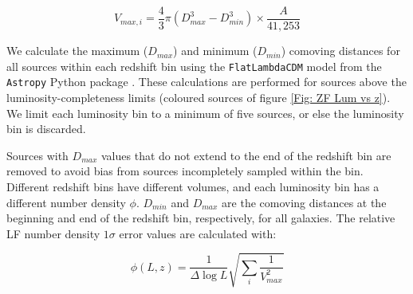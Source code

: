 \begin{equation}
    \label{EQ: Vmax}
    V_{max,i} = \frac{4}{3} \pi \left(D_{max}^3 - D_{min}^3\right) \times \frac{A}{41,253}
\end{equation}

We calculate the maximum ($D_{max}$) and minimum ($D_{min}$) comoving distances for all sources within each redshift bin using the \texttt{FlatLambdaCDM} model from the \texttt{Astropy} Python package \citep{astropy_collaboration_astropy_2022}. These calculations are performed for sources above the luminosity-completeness limits (coloured sources of figure \ref{Fig: ZF Lum vs z}). We limit each luminosity bin to a minimum of five sources, or else the luminosity bin is discarded. 

Sources with $D_{max}$ values that do not extend to the end of the redshift bin are removed to avoid bias from sources incompletely sampled within the bin. Different redshift bins have different volumes, and each luminosity bin has a different number density $\phi$. $D_{min}$ and $D_{max}$ are the comoving distances at the beginning and end of the redshift bin, respectively, for all galaxies. The relative LF number density $1\sigma$ error values are calculated with:

\begin{equation} \label{EQ: Vmax Error}
    \phi(L,z) = \frac{1}{\Delta \log L}\sqrt{\sum_i \frac{1}{V_{max}^2}}
\end{equation}

